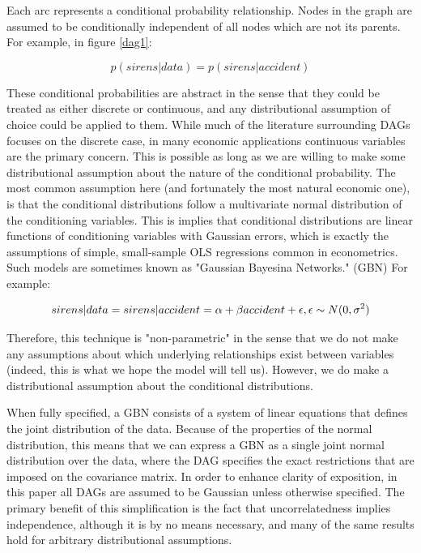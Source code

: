 \documentclass{article}
\begin{document}
Each arc represents a conditional probability relationship. Nodes in the graph are assumed to be conditionally independent of all nodes which are not its parents. For example, in figure \ref{dag1}: 

\begin{equation}
  \label{eq1}
  p(sirens | data) = p(sirens | accident)
\end{equation}

These conditional probabilities are abstract in the sense that they could be treated as either discrete or continuous, and any distributional assumption of choice could be applied to them. While much of the literature surrounding DAGs focuses on the discrete case, in many economic applications continuous variables are the primary concern. This is possible as long as we are willing to make some distributional assumption about the nature of the conditional probability. The most common assumption here (and fortunately the most natural economic one), is that the conditional distributions follow a multivariate normal distribution of the conditioning variables. This is implies that conditional distributions are linear functions of conditioning variables with Gaussian errors, which is exactly the assumptions of simple, small-sample OLS regressions common in econometrics. Such models are sometimes known as "Gaussian Bayesina Networks." (GBN) For example:

\begin{equation}
  \label{eq2}
  sirens|data = sirens|accident = \alpha + \beta accident + \epsilon, \space \epsilon \sim N(0, \sigma^2)
\end{equation}

Therefore, this technique is "non-parametric" in the sense that we do not make any assumptions about which underlying relationships exist between variables (indeed, this is what we hope the model will tell us). However, we do make a distributional assumption about the conditional distributions.

When fully specified, a GBN consists of a system of linear equations that defines the joint distribution of the data. Because of the properties of the normal distribution, this means that we can express a GBN as a single joint normal distribution over the data, where the DAG specifies the exact restrictions that are imposed on the covariance matrix. In order to enhance clarity of exposition, in this paper all DAGs are assumed to be Gaussian unless otherwise specified. The primary benefit of this simplification is the fact that uncorrelatedness implies independence, although it is by no means necessary, and many of the same results hold for arbitrary distributional assumptions.
\end{document}
